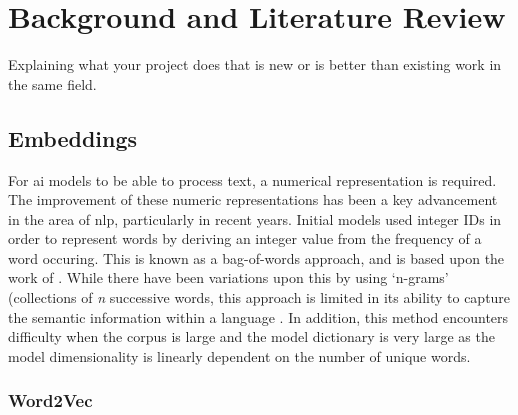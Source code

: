\chapter{Background and Literature Review}

\label{ch:background} 
\label{sec:background}


Explaining what your project does that is new or is better than existing work in the same field.

\section{Embeddings}
\label{sec:embeddings}

For \acrshort{ai} models to be able to process text, a numerical representation is required. The improvement of these numeric representations has been a key advancement in the area of \acrfull{nlp}, particularly in recent years. Initial models used integer IDs in order to represent words by deriving an integer value from the frequency of a word occuring. This is known as a bag-of-words approach, and is based upon the work of \citet{Zellig}. While there have been variations upon this by using `n-grams' (collections of \textit{n} successive words, this approach is limited in its ability to capture the semantic information within a language \citep{Monisha}. In addition, this method encounters difficulty when the corpus is large and the model dictionary is very large as the model dimensionality is linearly dependent on the number of unique words. 

\subsection{Word2Vec}
\label{sec:embeddings_word2vec}

